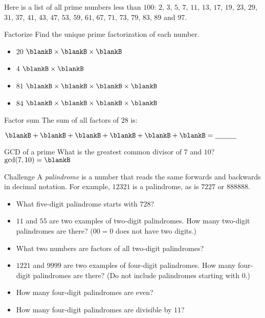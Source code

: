 \documentclass[12pt,letterpaper]{article}
\begin{document}
\pagebreak

Here is a list of all prime numbers less than $100$: $2$, $3$, $5$, $7$, $11$,
$13$, $17$, $19$, $23$, $29$, $31$, $37$, $41$, $43$, $47$, $53$, $59$, $61$,
$67$, $71$, $73$, $79$, $83$, $89$ and $97$.

\begin{problem}{Factorize}
 Find the unique prime factorization of each number.

 \begin{itemize}
  \item $20$ \hfill $\blankB \times \blankB \times \blankB$
  \item $4$ \hfill $\blankB \times \blankB$
  \item $81$ \hfill $\blankB \times \blankB \times \blankB \times \blankB$
  \item $84$ \hfill $\blankB \times \blankB \times \blankB \times \blankB$
 \end{itemize}
\end{problem}

\begin{problem}{Factor sum}
 The sum of all factors of $28$ is:

 $\blankB +
 \blankB +
 \blankB +
 \blankB +
 \blankB +
 \blankB = \underline{\hspace{3em}}$
\end{problem}

\begin{problem}{GCD of a prime}
 What is the greatest common divisor of $7$ and $10$? \hfill
 $\gcd(7, 10) = \blankB$
\end{problem}

\begin{problem}{Challenge}
 A \emph{palindrome} is a number that reads the same forwards and backwards in
 decimal notation. For example, $12321$ is a palindrome, as is $7227$ or
 $888888$.

 \begin{itemize}
  \item What five-digit palindrome starts with $728$? \underline{\hspace{5em}}
  \item $11$ and $55$ are two examples of two-digit palindromes.
  How many two-digit palindromes are there? ($00=0$ does not have two digits.)
  \item What two numbers are factors of all two-digit palindromes?
  \item $1221$ and $9999$ are two examples of four-digit palindromes. How many
  four-digit palindromes are there? (Do not include palindromes starting with
  $0$.)
  \item How many four-digit palindromes are even?
  \item How many four-digit palindromes are divisible by $11$?
 \end{itemize}
\end{problem}
\end{document}
